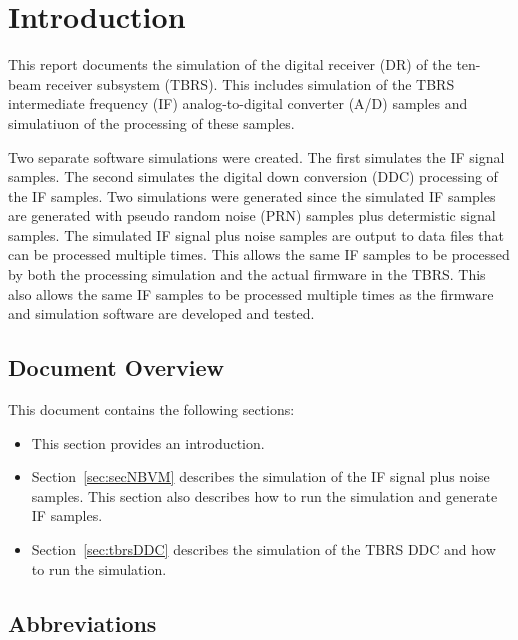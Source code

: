 \documentclass[12pt,english]{article}
\begin{document}
\section{Introduction}\label{sec:secIntro}

This report documents the simulation of the digital receiver (DR) of
the ten-beam receiver subsystem (TBRS). This includes simulation of
the TBRS intermediate frequency (IF) analog-to-digital converter (A/D)
samples and simulatiuon of the processing of these samples.

Two separate software simulations were created. The first simulates
the IF signal samples. The second simulates the digital down
conversion (DDC) processing of the IF samples. Two simulations were
generated since the simulated IF samples are generated with pseudo
random noise (PRN) samples plus determistic signal samples. The
simulated IF signal plus noise samples are output to data files that
can be processed multiple times. This allows the same IF samples to be
processed by both the processing simulation and the actual firmware in
the TBRS. This also allows the same IF samples to be processed
multiple times as the firmware and simulation software are developed
and tested.

\subsection{Document Overview}

This document contains the following sections:
\begin{itemize}

\item This section provides an introduction.

\item Section~\vref{sec:secNBVM} describes the simulation of the IF
signal plus noise samples. This section also describes how to run the
simulation and generate IF samples.

\item Section~\vref{sec:tbrsDDC} describes the simulation of the TBRS
DDC and how to run the simulation.

\end{itemize}


\subsection{Abbreviations}
\end{document}
